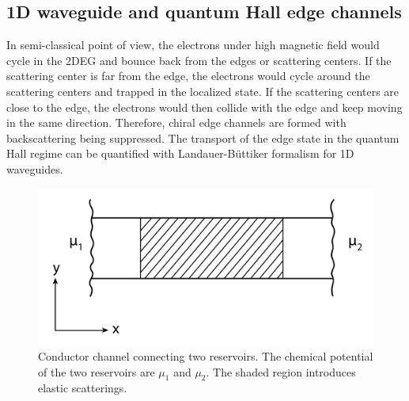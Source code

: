 \documentclass[pdflatex, sectionletters, 12pt]{pittetd}    %
\begin{document}
\subsection{1D waveguide and quantum Hall edge channels}

In semi-classical point of view, the electrons under high magnetic field would cycle in the 2DEG and bounce back from the edges or scattering centers. If the scattering center is far from the edge, the electrons would cycle around the scattering centers and trapped in the localized state. If the scattering centers are close to the edge, the electrons would then collide with the edge and keep moving in the same direction. Therefore, chiral edge channels are formed with backscattering being suppressed. The transport of the edge state in the quantum Hall regime can be quantified with Landauer-B{\"u}ttiker formalism for 1D waveguides\cite{buttiker1986four, buttiker1988absence}.
\\

\begin{figure}[h!]
	\centering
	\includegraphics[width=.5\textwidth]{Drawing/Channel.pdf}
	\caption{Conductor channel connecting two reservoirs. The chemical potential of the two reservoirs are $\mu_1$ and $\mu_2$. The shaded region introduces elastic scatterings.}
	\label{FIG:Channel}
\end{figure}
\end{document}
